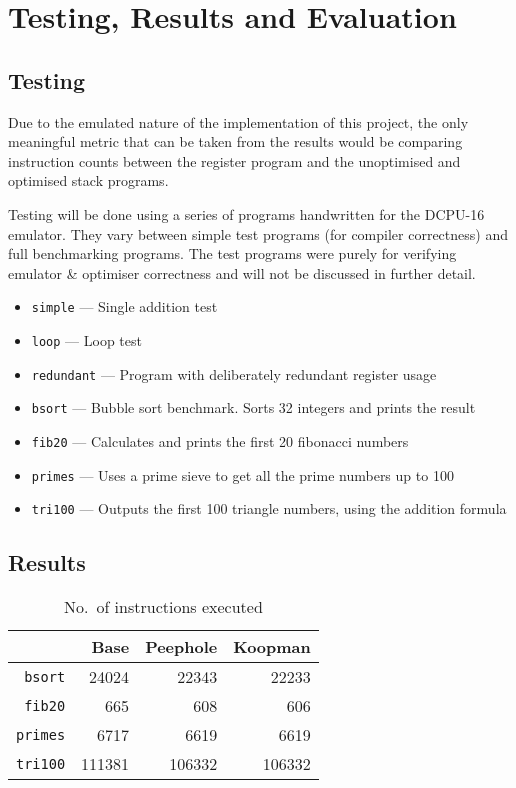\chapter{Testing, Results and Evaluation}\label{ch:testingresults}
\section{Testing}
Due to the emulated nature of the implementation of this project, the only
meaningful metric that can be taken from the results would be comparing
instruction counts between the register program and the unoptimised and
optimised stack programs.

Testing will be done using a series of programs handwritten for the DCPU-16
emulator. They vary between simple test programs (for compiler correctness) and
full benchmarking programs. The test programs were purely for verifying
emulator \& optimiser correctness and will not be discussed in further detail.

\begin{itemize}[noitemsep]
  \item \texttt{simple} --- Single addition test
  \item \texttt{loop} --- Loop test
  \item \texttt{redundant} --- Program with deliberately redundant register
  usage
    \vspace{2ex}
  \item \texttt{bsort} --- Bubble sort benchmark. Sorts 32 integers and prints
  the result
  \item \texttt{fib20} --- Calculates and prints the first 20 fibonacci numbers
  \item \texttt{primes} --- Uses a prime sieve to get all the prime numbers up
  to 100
  \item \texttt{tri100} --- Outputs the first 100 triangle numbers, using the
    addition formula
\end{itemize}

\section{Results}

\begin{table}
  \begin{tabular}{r r r r}
                    &   Base & Peephole & Koopman \\ \toprule
    \texttt{bsort}  &  24024 &    22343 &   22233 \\ \midrule
    \texttt{fib20}  &    665 &      608 &     606 \\ \midrule
    \texttt{primes} &   6717 &     6619 &    6619 \\ \midrule
    \texttt{tri100} & 111381 &   106332 &  106332 \\ \midrule
  \end{tabular}
  \caption{No.\ of instructions executed}\label{tab:instructions}
\end{table}


